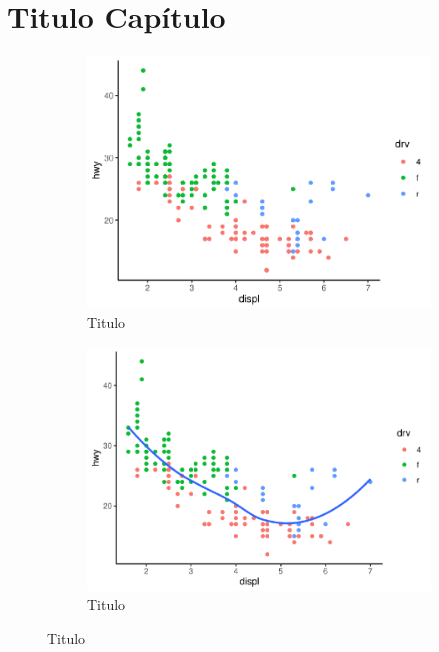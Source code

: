 \chapter{Titulo Capítulo}
	
\lipsum[1-6]
	
\begin{figure}[!h]
	\begin{subfigure}{\linewidth}
		\caption{Titulo}\label{fig:test}
		\includegraphics{fig/plot}
	\end{subfigure}
	\begin{subfigure}{\linewidth}
		\caption{Titulo}
		\includegraphics{fig/plot2}
	\end{subfigure}

\end{figure}
